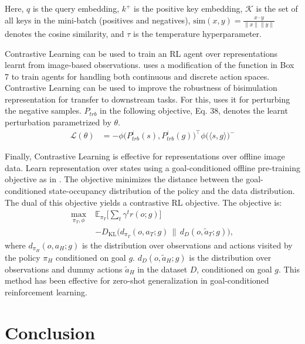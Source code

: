 \documentclass{article}
\begin{document}
Here, $q$ is the query embedding, $k^+$ is the positive key embedding, $\mathcal{K}$ is the set of all keys in the mini-batch (positives and negatives), $\text{sim}(x, y) = \frac{x \cdot y}{\|x\| \|y\|}$ denotes the cosine similarity, and $\tau$ is the temperature hyperparameter.

Contrastive Learning can be used to train an RL agent over representations learnt from image-based observations. \cite{laskin2020curl} uses a modification of the function in Box 7 to train agents for handling both continuous and discrete action spaces.  Contrastive Learning can be used to improve the robustness of bisimulation representation for transfer to downstream tasks. For this, \cite{yin2024representation} uses it for perturbing the negative samples. $P_{trb}$ in the following objective, Eq. 38, denotes the learnt perturbation parametrized by $\theta$.
\begin{align}
\mathcal{L}(\theta) &= - \phi \big( P_{trb}^i(s), P_{trb}^i(g) \big)^\top \phi\big( \langle s, g \rangle\big)^{-}
\end{align}


Finally, Contrastive Learning is effective for representations over offline image data. Learn representation over states using a goal-conditioned offline pre-training objective as in \cite{ma2022vip}. The objective minimizes the distance between the goal-conditioned state-occupancy distribution of the policy and the data distribution. The dual of this objective yields a contrastive RL objective. The objective is:
\begin{align}
\max_{\pi_T, \phi} \; & \mathbb{E}_{\pi_T} \Bigg[ \sum_t \gamma^t r(o; g) \Bigg] \nonumber \\
& - D_{\mathrm{KL}}\big(d_{\pi_T}(o, a_T; g) \,\|\, d_D(o, \tilde{a}_T; g)\big),
\end{align}
where $d_{\pi_H}(o, a_H; g)$ is the distribution over observations and actions visited by the policy $\pi_H$ conditioned on goal $g$. $d_D(o, \tilde{a}_H; g)$ is the distribution over observations and dummy actions $\tilde{a}_H$ in the dataset $D$, conditioned on goal $g$. This method has been effective for zero-shot generalization in goal-conditioned reinforcement learning.

\section{Conclusion}
\end{document}
